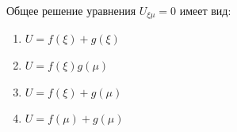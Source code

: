 Общее решение уравнения \(U_{\xi \mu }=0\) имеет вид:

\begin{enumerate}[label=\arabic*)]
    \item \(U=f\left(\xi \right)+g(\xi )\)
    \item \(U=f\left(\xi \right) g(\mu )\)
    \item \(U=f\left(\xi \right)+g(\mu )\)
    \item \(U=f\left(\mu \right)+g(\mu )\)
\end{enumerate}

